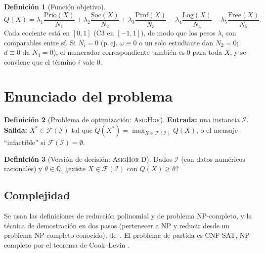\documentclass[11pt,letterpaper]{article}
\theoremstyle{definition}
\newtheorem{definicion}{Definición}
\theoremstyle{remark}
\theoremstyle{plain}
\newcommand{\Q}{\mathbb{Q}}
\begin{document}
\begin{definicion}[Función objetivo]
\[
Q(X)=\lambda_1\frac{\mathrm{Prio}(X)}{N_1}+\lambda_2\frac{\mathrm{Soc}(X)}{N_2}
+\lambda_3\frac{\mathrm{Prof}(X)}{N_3}
-\lambda_4\frac{\mathrm{Log}(X)}{N_4}-\lambda_5\frac{\mathrm{Free}(X)}{N_5}.
\]
Cada cociente está en $[0,1]$ (C3 en $[-1,1]$), de modo que los pesos
$\lambda_i$ son comparables entre sí. Si $N_i=0$ (p.\,ej. $\omega\equiv0$ o
un solo estudiante dan $N_2=0$; $d\equiv0$ da $N_4=0$), el numerador
correspondiente también es $0$ para toda $X$, y se conviene que el término
$i$ vale $0$.
\end{definicion}

\section{Enunciado del problema}
\begin{definicion}[Problema de optimización: \textsc{AsigHor}]
\textbf{Entrada:} una instancia $\mathcal{I}$. \\
\textbf{Salida:} $X^\ast\in\mathcal{F}(\mathcal{I})$ tal que
$Q(X^\ast)=\max_{X\in\mathcal{F}(\mathcal{I})}Q(X)$, o el mensaje
``infactible'' si $\mathcal{F}(\mathcal{I})=\emptyset$.
\end{definicion}

\begin{definicion}[Versión de decisión: \textsc{AsigHor-D}]
Dados $\mathcal{I}$ (con datos numéricos racionales) y $\theta\in\Q$,
¿existe $X\in\mathcal{F}(\mathcal{I})$ con $Q(X)\ge\theta$?
\end{definicion}

\subsection{Complejidad}
Se usan las definiciones de reducción polinomial y de problema NP-completo,
y la técnica de demostración en dos pasos (pertenecer a NP y reducir desde un
problema NP-completo conocido), de~\cite[§11.3]{levitin}. El problema de
partida es \textsc{CNF-SAT}, NP-completo por el teorema de Cook--Levin
\cite[p.~433]{levitin}.
\end{document}
